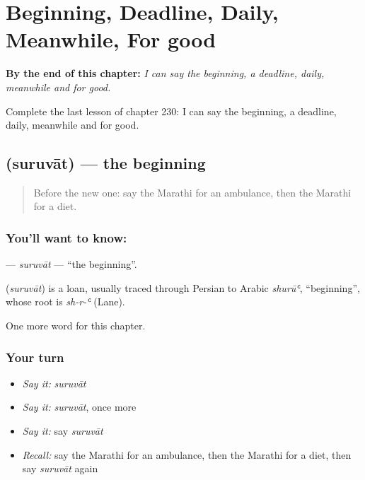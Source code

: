 
\chapter{Beginning, Deadline, Daily, Meanwhile, For good}
\label{ch:mr-beginning-deadline-daily-meanwhile-for-good}

\begin{chapteropening}
\textbf{By the end of this chapter:} \emph{I can say the beginning, a deadline, daily, meanwhile and for good.}

Complete the last lesson of chapter 230: I can say the beginning, a deadline, daily, meanwhile and for good.
\end{chapteropening}

\section[\texorpdfstring{\mr{सुरुवात} (suruvāt)}{सुरुवात (suruvāt)}]{ (suruvāt) — the beginning}

\label{lesson:MR-C230-suruvat}



\begin{quote}
Before the new one: say the Marathi for an ambulance, then the Marathi for a diet.
\end{quote}

\subsection*{You'll want to know: }
\textbf{} — \emph{suruvāt} — \textquotedblleft{}the beginning\textquotedblright{}.

\begin{cousinweb}
\textbf{} (\emph{suruvāt}) is a loan, usually traced through Persian to Arabic \emph{shurūʿ}, \textquotedblleft{}beginning\textquotedblright{}, whose root is \emph{sh-r-ʿ} (Lane).
\end{cousinweb}

\begin{grammarlens}[title={What you've built}]
One more word for this chapter.
\end{grammarlens}

\subsection*{Your turn}
\begin{itemize}
\raggedright
  \item \emph{Say it:} \emph{suruvāt}
  \item \emph{Say it:} \emph{suruvāt}, once more
  \item \emph{Say it:} say \emph{suruvāt}
  \item \emph{Recall:} say the Marathi for an ambulance, then the Marathi for a diet, then say \emph{suruvāt} again
\end{itemize}

